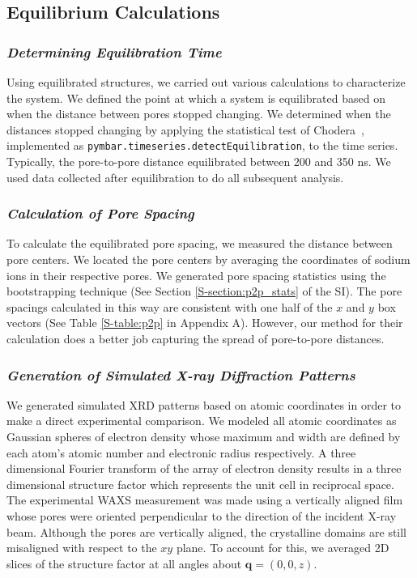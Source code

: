   \subsection{Equilibrium Calculations}

  \subsubsection{\textit{Determining Equilibration Time}}\label{method:equil_time}

  Using equilibrated structures, we carried out various calculations to
  characterize the system. We defined the point at which a system is equilibrated
  based on when the distance between pores stopped changing.  We determined when
  the distances stopped changing by applying the statistical test of Chodera~\cite{chodera_simple_2016},
  implemented as \texttt{pymbar.timeseries.detectEquilibration}, to the time series. Typically, the pore-to-pore
  distance equilibrated between 200 and 350 ns. We used data collected after 
  equilibration to do all subsequent analysis.

  \subsubsection{\textit{Calculation of Pore Spacing}}\label{method:pore_spacing}

  To calculate the equilibrated pore spacing, we measured the distance between
  pore centers. We located the pore centers by averaging the coordinates of
  sodium ions in their respective pores. We generated pore spacing statistics
  using the bootstrapping technique (See Section \ref{S-section:p2p_stats} of the
  SI). The pore spacings calculated in this way are consistent with one half of
  the $x$ and $y$ box vectors (See Table \ref{S-table:p2p} in Appendix A). However,
  our method for their calculation does a better job capturing the spread of
  pore-to-pore distances.

  \subsubsection{\textit{Generation of Simulated X-ray Diffraction Patterns}}\label{method:xrd}
  
  We generated simulated XRD patterns based on atomic coordinates in order to
  make a direct experimental comparison. We modeled all atomic coordinates as
  Gaussian spheres of electron density whose maximum and width are defined by
  each atom's atomic number and electronic radius respectively. A three dimensional
  Fourier transform of the array of electron density results in a three
  dimensional structure factor which represents the unit cell in reciprocal
  space. The experimental WAXS measurement was made using a vertically aligned
  film whose pores were oriented perpendicular to the direction of the incident
  X-ray beam. Although the pores are vertically aligned, the crystalline domains are
  still misaligned with respect to the $xy$ plane. To account for this, we averaged
  2D slices of the structure factor at all angles about $\mathbf{q} = (0, 0, z)$. 

